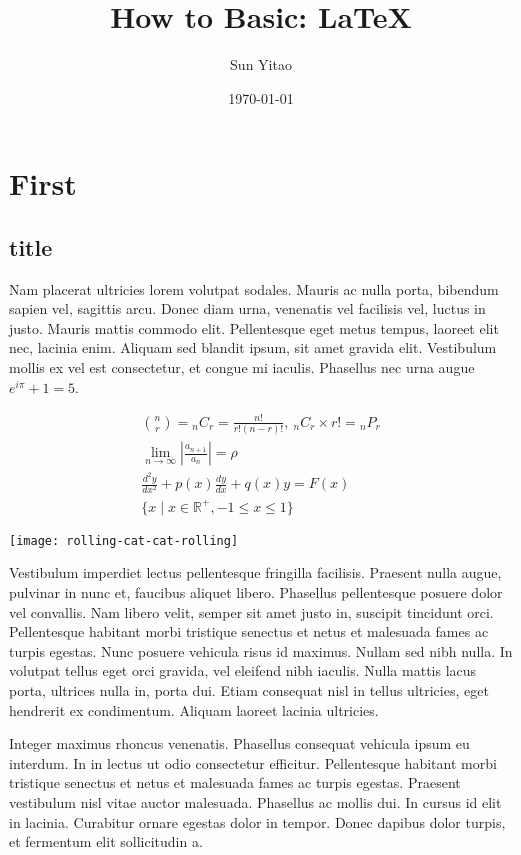 \documentclass{article}
\title{How to Basic: \LaTeX{}}
\author{Sun Yitao}
\date{\today}
\begin{document}
	\maketitle
	\tableofcontents
	
	\section{First}
	\subsection{title}
	Nam placerat ultricies lorem volutpat sodales. Mauris ac nulla porta, bibendum sapien vel, sagittis arcu. Donec diam urna, venenatis vel facilisis vel, luctus in justo. Mauris mattis commodo elit. Pellentesque eget metus tempus, laoreet elit nec, lacinia enim. Aliquam sed blandit ipsum, sit amet gravida elit. Vestibulum mollis ex vel est consectetur, et congue mi iaculis. Phasellus nec urna augue $e^{i \pi} + 1 = 5$.
	
	\begin{gather*}
		\binom{n}{r} = {}_nC_r = \frac{n!}{r! (n - r)!}, \  {}_nC_r \times r! =  {}_nP_r\\
		\lim_{n \rightarrow \infty} \left|\frac{a_{n + 1}}{a_n} \right| = \rho\\
		\frac{d^2y}{dx^2} + p(x)\frac{dy}{dx} + q(x)y = F(x)\\
		\{ x \mid x \in \mathbb{R}^+, -1 \leq x \leq 1 \}
	\end{gather*}

	\graphicspath{ {/Users/sunyitao/Downloads/rolling-cat-cat-rolling.jpg} }
	\texttt{[image: rolling-cat-cat-rolling]}
	
	Vestibulum imperdiet lectus pellentesque fringilla facilisis. Praesent nulla augue, pulvinar in nunc et, faucibus aliquet libero. Phasellus pellentesque posuere dolor vel convallis. Nam libero velit, semper sit amet justo in, suscipit tincidunt orci. Pellentesque habitant morbi tristique senectus et netus et malesuada fames ac turpis egestas. Nunc posuere vehicula risus id maximus. Nullam sed nibh nulla. In volutpat tellus eget orci gravida, vel eleifend nibh iaculis. Nulla mattis lacus porta, ultrices nulla in, porta dui. Etiam consequat nisl in tellus ultricies, eget hendrerit ex condimentum. Aliquam laoreet lacinia ultricies.
	
	Integer maximus rhoncus venenatis. Phasellus consequat vehicula ipsum eu interdum. In in lectus ut odio consectetur efficitur. Pellentesque habitant morbi tristique senectus et netus et malesuada fames ac turpis egestas. Praesent vestibulum nisl vitae auctor malesuada. Phasellus ac mollis dui. In cursus id elit in lacinia. Curabitur ornare egestas dolor in tempor. Donec dapibus dolor turpis, et fermentum elit sollicitudin a.
	
\end{document}
